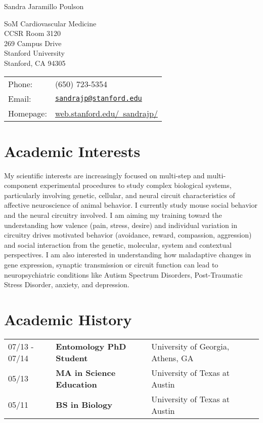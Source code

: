 \documentclass[letterpaper]{article}
\def\name{Sandra Jaramillo Poulson}
\begin{document}
{\huge \name}

\vspace{0.25in}

\begin{minipage}{0.325\linewidth}
  SoM Cardiovascular Medicine \\
  CCSR Room 3120 \\
  269 Campus Drive \\
  Stanford University \\
  Stanford, CA 94305 \\
  \end{minipage}
\begin{minipage}{0.45\linewidth}
  \begin{tabular}{ll}
    Phone:&(650) 723-5354 \\
    Email:&\href{mailto:sandrajp@stanford.edu}{\tt sandrajp@stanford.edu} \\
    Homepage: & \href{http://web.stanford.edu/~sandrajp/}{web.stanford.edu/~sandrajp/} \\
  \end{tabular}
\end{minipage}

\section*{Academic Interests}
My scientific interests are increasingly focused on multi-step and multi-component experimental procedures to study complex biological systems, particularly involving genetic, cellular, and neural circuit characteristics of affective neuroscience of animal behavior. I currently study mouse social behavior and the neural circuitry involved. I am aiming my training toward the understanding how valence (pain, stress, desire) and individual variation in circuitry drives motivated behavior (avoidance, reward, compassion, aggression) and social interaction from the genetic, molecular, system and contextual perspectives. I am also interested in understanding how maladaptive changes in gene expression, synaptic transmission or circuit function can lead to neuropsychiatric conditions like Autism Spectrum Disorders, Post-Traumatic Stress Disorder, anxiety, and depression.


\section*{Academic History}

\begin{tabular}{llll}
07/13 - 07/14 	& {\bf Entomology PhD Student}		& University of Georgia, Athens, GA \\
05/13         	& {\bf MA in Science Education}	        & University of Texas at Austin \\
05/11         	& {\bf BS in Biology}			& University of Texas at Austin \\
\end{tabular}
\end{document}
